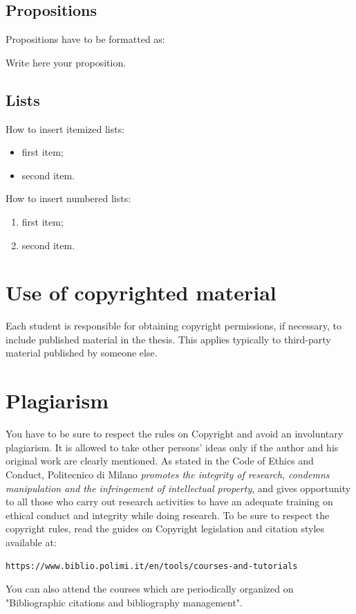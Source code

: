 \subsection{Propositions}
Propositions have to be formatted as:
\begin{proposition}
Write here your proposition.
\end{proposition}

\subsection{Lists}
How to  insert itemized lists:
\begin{itemize}
    \item first item;
    \item second item.
\end{itemize}
How to insert numbered lists:
\begin{enumerate}
    \item first item;
    \item second item.
\end{enumerate}

\section{Use of copyrighted material}

Each student is responsible for obtaining copyright permissions, if necessary, to include published material in the thesis.
This applies typically to third-party material published by someone else.

\section{Plagiarism}

You have to be sure to respect the rules on Copyright and avoid an involuntary plagiarism.
It is allowed to take other persons' ideas only if the author and his original work are clearly mentioned.
As stated in the Code of Ethics and Conduct, Politecnico di Milano \textit{promotes the integrity of research,
condemns manipulation and the infringement of intellectual property}, and gives opportunity to all those
who carry out research activities to have an adequate training on ethical conduct and integrity while doing research.
To be sure to respect the copyright rules, read the guides on Copyright legislation and citation styles available
at:
\begin{verbatim}
https://www.biblio.polimi.it/en/tools/courses-and-tutorials
\end{verbatim}
You can also attend the courses which are periodically organized on "Bibliographic citations and bibliography management".


